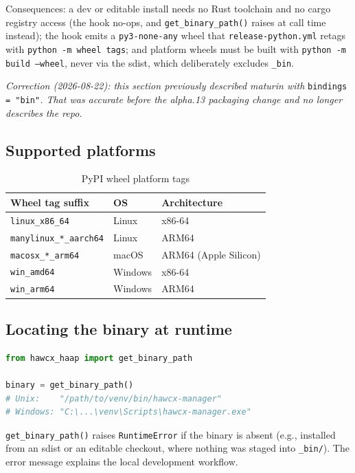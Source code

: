 \documentclass[11pt, a4paper]{article}
\newcommand{\code}[1]{\texttt{#1}}
\begin{document}
Consequences: a dev or editable install needs no Rust toolchain and no cargo
registry access (the hook no-ops, and \code{get\_binary\_path()} raises at call
time instead); the hook emits a \code{py3-none-any} wheel that
\code{release-python.yml} retags with \code{python -m wheel tags}; and platform
wheels must be built with \code{python -m build --wheel}, never via the sdist,
which deliberately excludes \code{\_bin}.

\emph{Correction (2026-08-22): this section previously described maturin with}
\code{bindings = "bin"}\emph{. That was accurate before the alpha.13 packaging
change and no longer describes the repo.}

\subsection{Supported platforms}

\begin{table}[h!]
\centering
\caption{PyPI wheel platform tags}
\renewcommand{\arraystretch}{1.2}
\begin{tabular}{@{} l l l @{}}
\toprule
\textbf{Wheel tag suffix} & \textbf{OS} & \textbf{Architecture} \\
\midrule
\code{linux\_x86\_64}           & Linux   & x86-64  \\
\code{manylinux\_*\_aarch64}    & Linux   & ARM64   \\
\code{macosx\_*\_arm64}         & macOS   & ARM64 (Apple Silicon) \\
\code{win\_amd64}               & Windows & x86-64  \\
\code{win\_arm64}               & Windows & ARM64   \\
\bottomrule
\end{tabular}
\end{table}

\subsection{Locating the binary at runtime}

\begin{lstlisting}[language=Python, caption={Resolving the bundled binary path}]
from hawcx_haap import get_binary_path

binary = get_binary_path()
# Unix:    "/path/to/venv/bin/hawcx-manager"
# Windows: "C:\...\venv\Scripts\hawcx-manager.exe"
\end{lstlisting}

\code{get\_binary\_path()} raises \code{RuntimeError} if the binary is absent
(e.g., installed from an sdist or an editable checkout, where nothing was
staged into \code{\_bin/}). The error message explains the local development
workflow.
\end{document}
